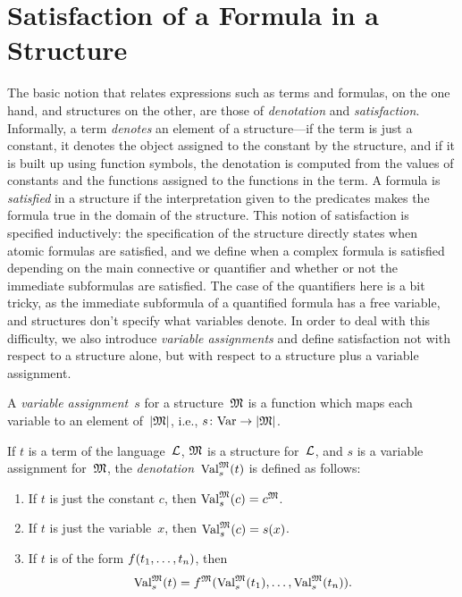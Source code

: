 \documentclass[syntax-and-semantics]{subfiles}
\begin{document}
\section{Satisfaction of a Formula in a Structure}

\begin{wordy}
The basic notion that relates expressions such as terms and formulas,
on the one hand, and structures on the other, are those of
\emph{denotation} and \emph{satisfaction}.  Informally, a term
\emph{denotes} an element of a structure---if the term is just a
constant, it denotes the object assigned to the constant by the
structure, and if it is built up using function symbols, the
denotation is computed from the values of constants and the functions
assigned to the functions in the term.  A formula is \emph{satisfied}
in a structure if the interpretation given to the predicates makes the
formula true in the domain of the structure. This notion of
satisfaction is specified inductively: the specification of the
structure directly states when atomic formulas are satisfied, and we
define when a complex formula is satisfied depending on the main
connective or quantifier and whether or not the immediate subformulas
are satisfied. The case of the quantifiers here is a bit tricky, as
the immediate subformula of a quantified formula has a free variable,
and structures don't specify what variables denote.  In order to deal
with this difficulty, we also introduce \emph{variable assignments}
and define satisfaction not with respect to a structure alone, but
with respect to a structure plus a variable assignment.
\end{wordy}

\begin{defn}
A \emph{variable assignment}~$s$ for a structure~$\mathfrak{M}$ is a
function which maps each variable to an element of~$\left| \mathfrak M \right|$, i.e.,
$s\colon \mathrm{Var} \to \left| \mathfrak M \right|$.
\end{defn}

\begin{defn}
If $t$ is a term of the language~$\mathcal L$, $\mathfrak M$ is a structure
for~$\mathcal L$, and $s$ is a variable assignment for~$\mathfrak M$, the
\emph{denotation}~$\Value{t}{M}[s]$ is defined as follows:
\begin{enumerate}
\item If $t$ is just the constant $c$, then $\Value{c}{M}[s] = \Assign{c}{M}$.
\item If $t$ is just the variable~$x$, then $\Value{c}{M}[s] = s(x)$.
\item If $t$ is of the form ${ f(t_1, \ldots, t_n) }$, then
\[
\Value{t}{M}[s] = \Assign{f}{M}(\Value{t_1}{M}[s], \ldots,
\Value{t_n}{M}[s]).
\]
\end{enumerate}
\end{defn}
\end{document}
